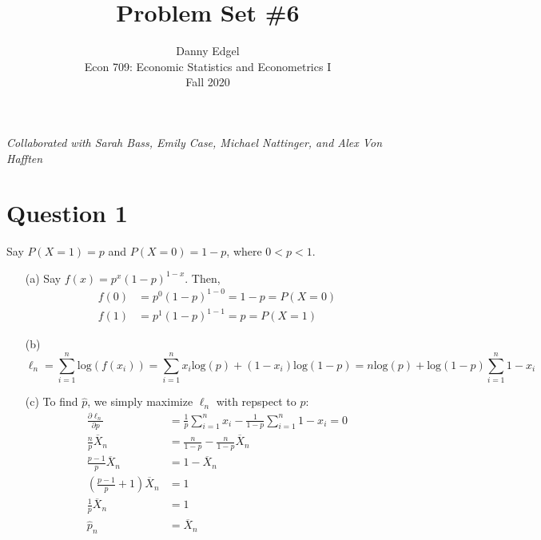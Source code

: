 \documentclass{article}
\newcommand{\olx}[1]{\overline{X}_{#1}}
\newcommand{\sumn}{\sum_{i=1}^{n}}
\newcommand{\loge}[1]{\text{log}\left(#1\right)}
\begin{document}
\title{	Problem Set \#6 }
\author{ 	Danny Edgel 										\\ 
			Econ 709: Economic Statistics and Econometrics I	\\
			Fall 2020											\\
		}
\maketitle\thispagestyle{empty}


\noindent\textit{Collaborated with Sarah Bass, Emily Case, Michael Nattinger, and Alex Von Hafften}

\section*{Question 1}
Say $P(X=1)=p$ and $P(X=0)=1-p$, where $0<p<1$.
\begin{itemize}
	\item[(a)] Say $f(x)=p^x(1-p)^{1-x}$. Then,
		\begin{align*}
			f(0) &= p^0(1-p)^{1-0} = 1-p = P(X=0)	\\
			f(1) &= p^1(1-p)^{1-1} = p = P(X=1)
		\end{align*}
	\item[(b)] 
		\[
			\ell_n = \sum_{i=1}^n \loge{f(x_i)} = \sum_{i=1}^nx_i\loge{p} + (1-x_i)\loge{1-p} = n\loge{p} + \loge{1-p}\sumn1-x_i
		\]
	\item[(c)] To find $\hat{p}$, we simply maximize $\ell_n$ with repspect to $p$:
		\begin{align*}
			\frac{\partial\ell_n}{\partial p} &= \frac{1}{p}\sumn x_i - \frac{1}{1-p}\sumn 1-x_i = 0	\\
			\frac{n}{p}\overline{X}_n &= \frac{n}{1-p} - \frac{n}{1-p}\overline{X}_n	\\
			\frac{p-1}{p}\olx{n} &= 1 - \olx{n} \\
			\left(\frac{p-1}{p}+1\right)\olx{n} &= 1 \\
			\frac{1}{p}\olx{n} &= 1 \\
			\hat{p}_n &= \olx{n}
		\end{align*}
\end{itemize}


\end{document}
